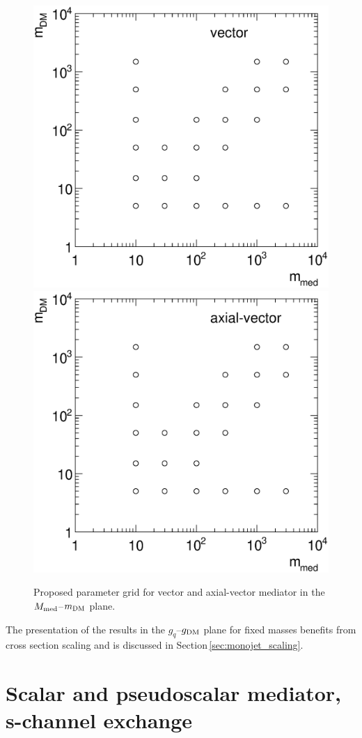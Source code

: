 \begin{figure}
\centering
\includegraphics[width=0.45\linewidth]{figures/monojet/grid_V.eps}
\includegraphics[width=0.45\linewidth]{figures/monojet/grid_A.eps}
\caption{Proposed parameter grid for vector and axial-vector mediator in the $M_{\rm{med}}$--$m_{\rm{DM}}$ plane.}
\label{fig:monojet_grid_V}
\end{figure}

The presentation of the results in the $g_q$--$g_{\rm{DM}}$ plane for fixed masses benefits from cross section scaling and is discussed in Section\,\ref{sec:monojet_scaling}.






\section{Scalar and pseudoscalar mediator, s-channel exchange}


